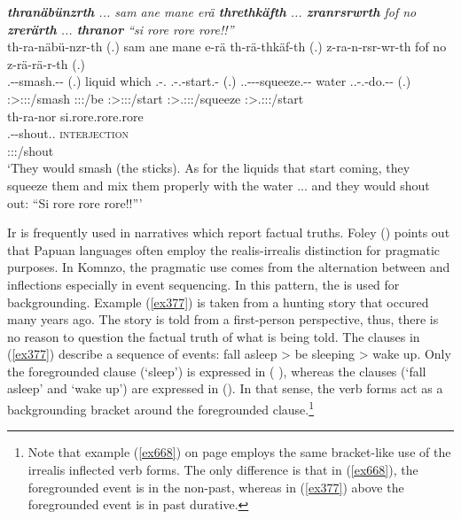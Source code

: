 \begin{exe}
	\ex \emph{\textbf{thranäbünzrth} ... sam ane mane erä \textbf{threthkäfth} ... \textbf{zranrsrwrth} fof no \textbf{zrerärth} ... \textbf{thranor} ``si rore rore rore!!''}\\
	\glll th-ra-näbü-nzr-th (.) sam ane mane e-rä th-rä-thkäf-th (.) z-ra-n-rsr-wr-th fof no z-rä-rä-r-th (.)\\
	\Stnsg.\Bet-\Irr-smash.\Ext-\Ndu-\Stnsg{} (.) liquid \Dem{} which \Stnsg.\Alph-\Cop.\Ndu{} \Stnsg.\Bet-\Irr.\Ndu-start.\Rs-\Stnsg{} (.) \Tsg.\F.\Bet-\Irr-\Venit-squeeze.\Ext-\Ndu-\Stnsg{} \Emph{} water \Tsg.\F.\Bet-\Irr.\Vc-do.\Ext-\Ndu-\Stnsg{} (.)\\
	\footnotesize{\Stpl:\Sbj>\Stpl:\Obj:\Irr:\Ipfv/smash} {} {} {} {} \footnotesize{\Stpl:\Sbj:\Nonpast:\Ipfv/be} \footnotesize{\Stpl:\Sbj>\Stpl:\Obj:\Irr:\Pfv/start} {}  \footnotesize{\Stpl:\Sbj>\Tsg.\F:\Obj:\Irr:\Ipfv/squeeze} {} {} \footnotesize{\Stpl:\Sbj>\Tsg.\F:\Io:\Irr:\Ipfv/start} {}\\
	\sn
	\glll th-ra-nor {si.rore.rore.rore}\\
	\Stnsg.\Bet-\Irr-shout.\Ext.\Ndu{} {\textsc{interjection}}\\
	\footnotesize{\Stpl:\Sbj:\Irr:\Ipfv/shout} {}\\
	\trans `They would smash (the sticks). As for the liquids that start coming, they squeeze them and mix them properly with the water ... and they would shout out: ``Si rore rore rore!!''' 
	\label{ex426}
\end{exe}

Ir  is frequently used in narratives which report factual truths. Foley (\citeyear[389]{Foley:2000uh}) points out that Papuan languages often employ the realis-irrealis distinction for pragmatic purposes. In Komnzo, the pragmatic use comes from the alternation between  and  inflections especially in event sequencing. In this pattern, the  is used for backgrounding. Example (\ref{ex377}) is taken from a hunting story that occured many years ago. The story is told from a first-person perspective, thus, there is no reason to question the factual truth of what is being told. The clauses in (\ref{ex377}) describe a sequence of events: fall asleep > be sleeping > wake up. Only the foregrounded clause (`sleep') is expressed in  ( ), whereas the  clauses (`fall asleep' and `wake up') are expressed in  (). In that sense, the  verb forms act as a backgrounding bracket around the foregrounded clause.\footnote{Note that example (\ref{ex668}) on page \pageref{ex668} employs the same bracket-like use of the irrealis inflected verb forms. The only difference is that in (\ref{ex668}), the foregrounded event is in the non-past, whereas in (\ref{ex377}) above the foregrounded event is in past durative.}

